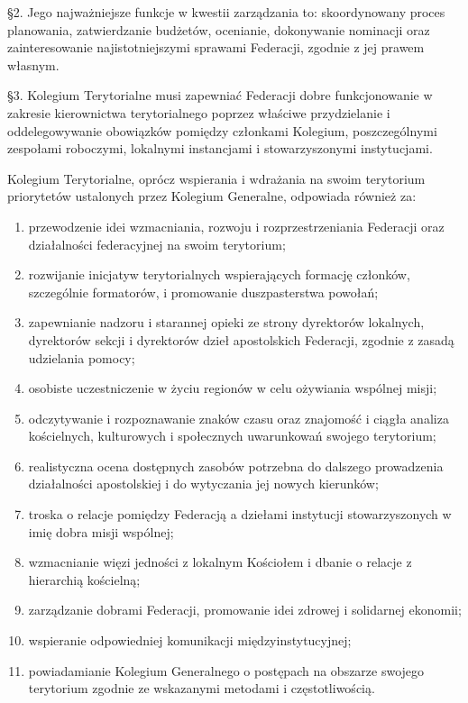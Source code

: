 \S{}2. Jego najważniejsze funkcje w kwestii zarządzania to: skoordynowany proces planowania, zatwierdzanie budżetów, ocenianie, dokonywanie nominacji oraz zainteresowanie najistotniejszymi sprawami Federacji, zgodnie z jej prawem własnym.

\S{}3. Kolegium Terytorialne musi zapewniać Federacji dobre funkcjonowanie w zakresie kierownictwa terytorialnego poprzez właściwe przydzielanie i oddelegowywanie obowiązków pomiędzy członkami Kolegium, poszczególnymi zespołami roboczymi, lokalnymi instancjami i stowarzyszonymi instytucjami.

 Kolegium Terytorialne, oprócz wspierania i wdrażania na swoim terytorium priorytetów ustalonych przez Kolegium Generalne, odpowiada również za:
\begin{enumerate}
	
	\item przewodzenie idei wzmacniania, rozwoju i rozprzestrzeniania Federacji oraz działalności federacyjnej na swoim terytorium;
	
	\item rozwijanie inicjatyw terytorialnych wspierających formację członków, szczególnie formatorów, i promowanie duszpasterstwa powołań;
	
	\item zapewnianie nadzoru i starannej opieki ze strony dyrektorów lokalnych, dyrektorów sekcji i dyrektorów dzieł apostolskich Federacji, zgodnie z zasadą udzielania pomocy;
	
	\item osobiste uczestniczenie w życiu regionów w celu ożywiania wspólnej misji;
	
	\item odczytywanie i rozpoznawanie znaków czasu oraz znajomość i ciągła analiza kościelnych, kulturowych i społecznych uwarunkowań swojego terytorium;
	
	\item realistyczna ocena dostępnych zasobów potrzebna do dalszego prowadzenia działalności apostolskiej i do wytyczania jej nowych kierunków;
	
	\item troska o relacje pomiędzy Federacją a dziełami instytucji stowarzyszonych w imię dobra misji wspólnej;
	
	\item wzmacnianie więzi jedności z lokalnym Kościołem i dbanie o relacje z hierarchią kościelną;
	
	\item zarządzanie dobrami Federacji, promowanie idei zdrowej i solidarnej ekonomii;
	
	\item wspieranie odpowiedniej komunikacji międzyinstytucyjnej;
	
	\item powiadamianie Kolegium Generalnego o postępach na obszarze swojego terytorium zgodnie ze wskazanymi metodami i częstotliwością.
\end{enumerate}

